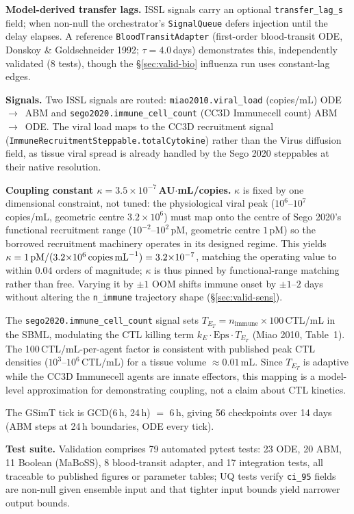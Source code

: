 \documentclass[conference,letterpaper,10pt]{IEEEtran}
\begin{document}
\textbf{Model-derived transfer lags.} ISSL signals carry an optional
\texttt{transfer\_lag\_s} field; when non-null the orchestrator's
\texttt{SignalQueue} defers injection until the delay elapses. A reference
\texttt{BloodTransitAdapter} (first-order blood-transit ODE, Donskoy \&
Goldschneider 1992; $\tau=4.0$\,days) demonstrates this, independently
validated (8 tests), though the \S\ref{sec:valid-bio} influenza run uses
constant-lag edges.

\textbf{Signals.} Two ISSL signals are routed:
\texttt{miao2010.viral\_load} (copies/mL) ODE~$\to$~ABM and
\texttt{sego2020.immune\_cell\_count} (CC3D Immunecell count) ABM~$\to$~ODE.
The viral load maps to the CC3D recruitment signal
(\texttt{ImmuneRecruitmentSteppable.totalCytokine}) rather than the Virus
diffusion field, as tissue viral spread is already handled by the Sego 2020
steppables at their native resolution.

\textbf{Coupling constant $\kappa = 3.5{\times}10^{-7}$\,AU$\cdot$mL/copies.}
$\kappa$ is fixed by one dimensional constraint, not tuned: the physiological
viral peak ($10^{6}$--$10^{7}$\,copies/mL, geometric centre
$3.2{\times}10^{6}$) must map onto the centre of Sego 2020's functional
recruitment range ($10^{-2}$--$10^{2}$\,pM, geometric centre $1$\,pM) so the
borrowed recruitment machinery operates in its designed regime. This yields
$\kappa = 1\,\text{pM}/(3.2{\times}10^{6}\,\text{copies\,mL}^{-1}) =
3.2{\times}10^{-7}$, matching the operating value to within $0.04$ orders of
magnitude; $\kappa$ is thus pinned by functional-range matching rather than
free. Varying it by $\pm 1$ OOM shifts immune onset by $\pm 1$--$2$ days
without altering the \texttt{n\_immune} trajectory shape
(\S\ref{sec:valid-sens}).

The \texttt{sego2020.immune\_cell\_count} signal sets
$T_{E_T} = n_{\text{immune}} \times 100$\,CTL/mL in the SBML, modulating the
CTL killing term $k_E \cdot \mathrm{Eps} \cdot T_{E_T}$ (Miao 2010,
Table~1). The 100\,CTL/mL-per-agent factor is consistent with published
peak CTL densities ($10^{3}$--$10^{6}$\,CTL/mL) for a tissue volume
$\approx 0.01$\,mL. Since $T_{E_T}$ is adaptive while the CC3D Immunecell
agents are innate effectors, this mapping is a model-level approximation
for demonstrating coupling, not a claim about CTL kinetics.

The GSimT tick is GCD(6\,h, 24\,h) $=$ 6\,h, giving 56 checkpoints over
14 days (ABM steps at 24\,h boundaries, ODE every tick).

\textbf{Test suite.} Validation comprises 79 automated pytest tests: 23
ODE, 20 ABM, 11 Boolean (MaBoSS), 8 blood-transit adapter, and 17
integration tests, all traceable to published figures or parameter tables;
UQ tests verify \texttt{ci\_95} fields are non-null given ensemble input and
that tighter input bounds yield narrower output bounds.
\end{document}
